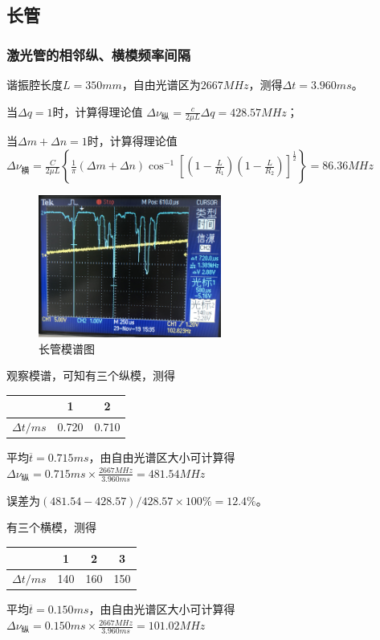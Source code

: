 \documentclass[UTF8]{ctexart}
\begin{document}
\begin{multicols}{2}
\subsection{长管}
\subsubsection{激光管的相邻纵、横模频率间隔}
谐振腔长度$L=350mm$，自由光谱区为$2667MHz$，测得$\Delta t=3.960ms$。

当$\Delta q=1$时，计算得理论值
\newline $\Delta \nu_{\mbox{纵}}=\frac{c}{2 \mu L} \Delta q=428.57MHz$；

当$\Delta m+\Delta n=1$时，计算得理论值
\newline $\Delta \nu_{\mbox{横}}=\frac{C}{2 \mu L}\left\{\frac{1}{\pi}(\Delta m+\Delta n) \cos ^{-1}\left[\left(1-\frac{L}{R_{1}}\right)\left(1-\frac{L}{R_{2}}\right)\right]^{\frac{1}{2}}\right\}=86.36MHz$

\begin{figure}[H]
\centering
\includegraphics[width=6cm]{long-lengthways}
\caption{长管模谱图}
\end{figure}

观察模谱，可知有三个纵模，测得
\begin{table}[H]
\centering
\tiny
\begin{tabular}{|c|c|c|}
\hline
                 & 1     & 2     \\ \hline
$\Delta t/ms$ & 0.720 & 0.710 \\ \hline
\end{tabular}
\end{table}
平均$\overline{t}=0.715ms$，由自由光谱区大小可计算得
\newline$\Delta \nu_{\mbox{纵}}=0.715ms\times\frac{2667MHz}{3.960ms}=481.54MHz$

误差为$(481.54-428.57)/428.57\times100\%=12.4\%$。

有三个横模，测得
\begin{table}[H]
\centering
\tiny
\begin{tabular}{|c|c|c|c|}
\hline
                 & 1     & 2  &3   \\ \hline
$\Delta t/ms$ & 140 & 160 &150 \\ \hline
\end{tabular}
\end{table}
平均$\overline{t}=0.150ms$，由自由光谱区大小可计算得
\newline$\Delta \nu_{\mbox{纵}}=0.150ms\times\frac{2667MHz}{3.960ms}=101.02MHz$


\end{multicols}
\end{document}
